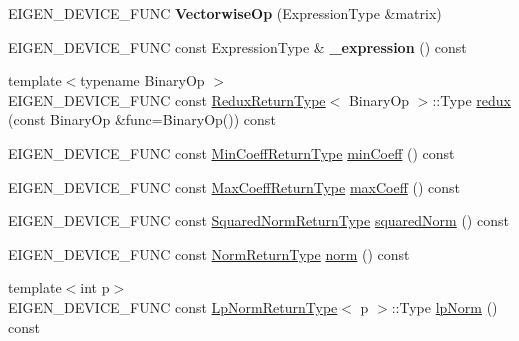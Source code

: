 \begin{DoxyCompactItemize}
\item 
\mbox{\label{class_eigen_1_1_vectorwise_op_ad321af7262d0da2e21440f966bba745a}} 
E\+I\+G\+E\+N\+\_\+\+D\+E\+V\+I\+C\+E\+\_\+\+F\+U\+NC {\bfseries Vectorwise\+Op} (Expression\+Type \&matrix)
\item 
\mbox{\label{class_eigen_1_1_vectorwise_op_a5687aca3b433944afc39f8cdd058562e}} 
E\+I\+G\+E\+N\+\_\+\+D\+E\+V\+I\+C\+E\+\_\+\+F\+U\+NC const Expression\+Type \& {\bfseries \+\_\+expression} () const
\item 
{\footnotesize template$<$typename Binary\+Op $>$ }\\E\+I\+G\+E\+N\+\_\+\+D\+E\+V\+I\+C\+E\+\_\+\+F\+U\+NC const \mbox{\hyperlink{struct_eigen_1_1_vectorwise_op_1_1_redux_return_type}{Redux\+Return\+Type}}$<$ Binary\+Op $>$\+::Type \mbox{\hyperlink{class_eigen_1_1_vectorwise_op_a798df97b5445eb6370fe5c90be2f7962}{redux}} (const Binary\+Op \&func=Binary\+Op()) const
\item 
E\+I\+G\+E\+N\+\_\+\+D\+E\+V\+I\+C\+E\+\_\+\+F\+U\+NC const \mbox{\hyperlink{class_eigen_1_1_partial_redux_expr}{Min\+Coeff\+Return\+Type}} \mbox{\hyperlink{class_eigen_1_1_vectorwise_op_a05f6f60662c06b4987e7eaf747a032c0}{min\+Coeff}} () const
\item 
E\+I\+G\+E\+N\+\_\+\+D\+E\+V\+I\+C\+E\+\_\+\+F\+U\+NC const \mbox{\hyperlink{class_eigen_1_1_partial_redux_expr}{Max\+Coeff\+Return\+Type}} \mbox{\hyperlink{class_eigen_1_1_vectorwise_op_a48457cc94227563bca448496aaad8e9c}{max\+Coeff}} () const
\item 
E\+I\+G\+E\+N\+\_\+\+D\+E\+V\+I\+C\+E\+\_\+\+F\+U\+NC const \mbox{\hyperlink{class_eigen_1_1_partial_redux_expr}{Squared\+Norm\+Return\+Type}} \mbox{\hyperlink{class_eigen_1_1_vectorwise_op_a6f23ba41822436d3176d718596be8fd0}{squared\+Norm}} () const
\item 
E\+I\+G\+E\+N\+\_\+\+D\+E\+V\+I\+C\+E\+\_\+\+F\+U\+NC const \mbox{\hyperlink{class_eigen_1_1_partial_redux_expr}{Norm\+Return\+Type}} \mbox{\hyperlink{class_eigen_1_1_vectorwise_op_a1c098483dfb35329f11b769cb5c1b6c1}{norm}} () const
\item 
{\footnotesize template$<$int p$>$ }\\E\+I\+G\+E\+N\+\_\+\+D\+E\+V\+I\+C\+E\+\_\+\+F\+U\+NC const \mbox{\hyperlink{struct_eigen_1_1_vectorwise_op_1_1_lp_norm_return_type}{Lp\+Norm\+Return\+Type}}$<$ p $>$\+::Type \mbox{\hyperlink{class_eigen_1_1_vectorwise_op_a87b514857655134e74ee313d865ab6d6}{lp\+Norm}} () const

\end{DoxyCompactItemize}
